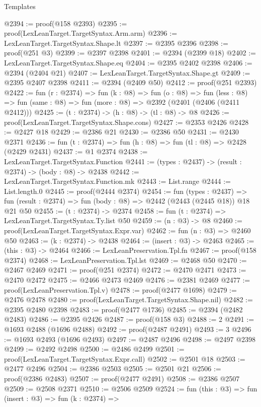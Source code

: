 \begin{lexlean}{Templates}
\begin{coremodule}
@2394 := proof(@158 @2393)
@2395 := proof(LexLeanTarget.TargetSyntax.Arm.arm)
@2396 := LexLeanTarget.TargetSyntax.Shape.lt
@2397 := @2395 @2396
@2398 := proof(@251 @3)
@2399 := @2397 @2398
@2401 := @2394 (@2399 @18)
@2402 := LexLeanTarget.TargetSyntax.Shape.eq
@2404 := @2395 @2402 @2398
@2406 := @2394 (@2404 @21)
@2407 := LexLeanTarget.TargetSyntax.Shape.gt
@2409 := @2395 @2407 @2398
@2411 := @2394 (@2409 @50)
@2412 := proof(@251 @2393)
@2422 := fun (r : @2374) =>
  fun (k : @8) =>
  fun (o : @8) =>
  fun (less : @8) => fun (same : @8) => fun (more : @8) => @2392 (@2401 (@2406 (@2411 @2412)))
@2425 := (t : @2374) -> (h : @8) -> (tl : @8) -> @8
@2426 := proof(LexLeanTarget.TargetSyntax.Shape.cons)
@2427 := @2353 @2426
@2428 := @2427 @18
@2429 := @2386 @21
@2430 := @2386 @50
@2431 := @2430 @2371
@2436 := fun (t : @2374) => fun (h : @8) => fun (tl : @8) => @2428 (@2429 @2431)
@2437 := @1 @2374
@2438 := LexLeanTarget.TargetSyntax.Function
@2441 := (types : @2437) -> (result : @2374) -> (body : @8) -> @2438
@2442 := LexLeanTarget.TargetSyntax.Function.mk
@2443 := List.range
@2444 := List.length.{0}
@2445 := proof(@2444 @2374)
@2454 := fun (types : @2437) =>
  fun (result : @2374) => fun (body : @8) => @2442 (@2443 (@2445 @18)) @18 @21 @50
@2455 := (t : @2374) -> @2374
@2458 := fun (t : @2374) => LexLeanTarget.TargetSyntax.Ty.list @50
@2459 := (n : @3) -> @8
@2460 := proof(LexLeanTarget.TargetSyntax.Expr.var)
@2462 := fun (n : @3) => @2460 @50
@2463 := (k : @2374) -> @2438
@2464 := (insert : @3) -> @2463
@2465 := (this : @3) -> @2464
@2466 := LexLeanPreservation.Tpl.fn
@2467 := proof(@158 @2374)
@2468 := LexLeanPreservation.Tpl.lst
@2469 := @2468 @50
@2470 := @2467 @2469
@2471 := proof(@251 @2374)
@2472 := @2470 @2471
@2473 := @2470 @2472
@2475 := @2466 @2473 @2469
@2476 := @2381 @2469
@2477 := proof(LexLeanPreservation.Tpl.v)
@2478 := proof(@2477 @1698)
@2479 := @2476 @2478
@2480 := proof(LexLeanTarget.TargetSyntax.Shape.nil)
@2482 := @2395 @2480 @2398
@2483 := proof(@2477 @1736)
@2485 := @2394 (@2482 @2483)
@2486 := @2395 @2426
@2487 := proof(@158 @3)
@2488 := 2
@2491 := @1693 @2488 (@1696 @2488)
@2492 := proof(@2487 @2491)
@2493 := 3
@2496 := @1693 @2493 (@1696 @2493)
@2497 := @2487 @2496
@2498 := @2497 @2398
@2499 := @2492 @2498
@2500 := @2486 @2499
@2501 := proof(LexLeanTarget.TargetSyntax.Expr.call)
@2502 := @2501 @18
@2503 := @2477 @2496
@2504 := @2386 @2503
@2505 := @2501 @21
@2506 := proof(@2386 @2483)
@2507 := proof(@2477 @2491)
@2508 := @2386 @2507
@2509 := @2508 @2371
@2510 := @2506 @2509
@2524 := fun (this : @3) =>
  fun (insert : @3) =>
  fun (k : @2374) =>

\end{coremodule}
\end{lexlean}
